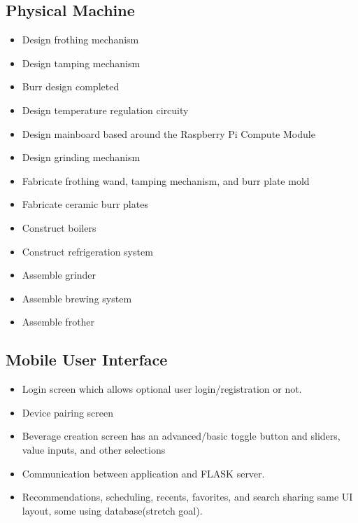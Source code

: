 \documentclass[conference]{IEEEtran}
\begin{document}
\subsection{Physical Machine}

\begin{itemize}
\item Design frothing mechanism
\item Design tamping mechanism
\item Burr design completed
\item Design temperature regulation circuity
\item Design mainboard based around the Raspberry Pi Compute Module
\item Design grinding mechanism
\item Fabricate frothing wand, tamping mechanism, and burr plate mold
\item Fabricate ceramic burr plates
\item Construct boilers
\item Construct refrigeration system
\item Assemble grinder
\item Assemble brewing system
\item Assemble frother
\end{itemize}

\subsection{Mobile User Interface}
\begin{itemize}
  \item Login screen which allows optional user login/registration or not.
  \item Device pairing screen
  \item Beverage creation screen has an advanced/basic toggle button and sliders, value inputs, and other selections
  \item Communication between application and FLASK server.
  \item Recommendations, scheduling, recents, favorites, and search sharing same UI layout, some using database(stretch goal).
\end{itemize}

\end{document}
